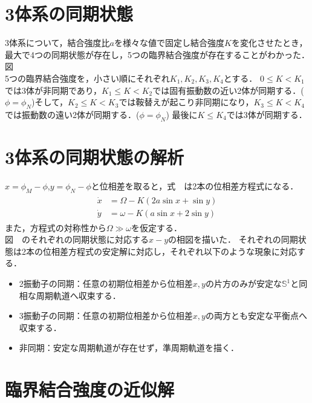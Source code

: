\documentclass[../main]{subfiles}
\begin{document}
\section{3体系の同期状態}
3体系について，結合強度比$a$を様々な値で固定し結合強度$K$を変化させたとき，最大で4つの同期状態が存在し，5つの臨界結合強度が存在することがわかった．
図\\
5つの臨界結合強度を，小さい順にそれぞれ$K_1,K_2,K_3,K_4$とする．
$0\leq K<K_1$では3体が非同期であり，$K_1\leq K<K_2$では固有振動数の近い2体が同期する．($\phi=\phi_N$)そして，$K_2\leq K<K_3$では鞍替えが起こり非同期になり，$K_3\leq K<K_4$では振動数の遠い2体が同期する．($\phi=\phi_N$) 最後に$K\leq K_4$では3体が同期する．
\section{3体系の同期状態の解析}
$x=\phi_M-\phi$,$y=\phi_N-\phi$と位相差を取ると，式　は2本の位相差方程式になる．
\begin{align}
    \label{eq:phase-diff}
    \begin{split}
    \dot{x}&=\Omega-K(2a\sin x+\sin y)\\
    \dot{y}&=\omega-K(a\sin x+2\sin y)
    \end{split}
\end{align}
また，方程式の対称性から$\Omega\gg\omega$を仮定する．\\
図　のそれぞれの同期状態に対応する$x-y$の相図を描いた．
それぞれの同期状態は2本の位相差方程式の安定解に対応し，それぞれ以下のような現象に対応する．
\begin{itemize}
    \item 
    2振動子の同期：任意の初期位相差から位相差$x,y$の片方のみが安定な$\mathbb{S}^1$と同相な周期軌道へ収束する．
    \item
    3振動子の同期：任意の初期位相差から位相差$x,y$の両方とも安定な平衡点へ収束する．
    \item
    非同期：安定な周期軌道が存在せず，準周期軌道を描く．
\end{itemize}
\section{臨界結合強度の近似解}
\end{document}
